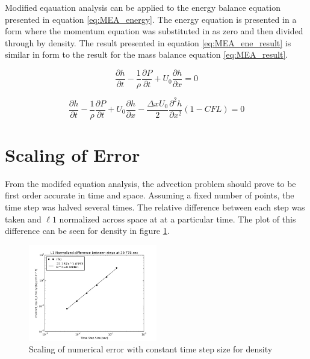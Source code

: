     Modified eqauation analysis can be applied to the energy balance equation
    presented in equation \ref{eq:MEA_energy}. The energy equation is presented in a form where
    the momentum equation was substituted in as zero and then divided through by
    density. The result presented in equation \ref{eq:MEA_ene_result} is similar in
    form to the result for the mass balance equation \ref{eq:MEA_result}.
    
    \begin{equation}
    	\label{eq:MEA_energy}
    	\frac{\partial h}{\partial t} - \frac{1}{\rho} \frac{\partial P}{\partial t} +
    	U_{0} \frac{\partial h}{\partial x} = 0
    \end{equation}
    
    \begin{equation}
    \label{eq:MEA_ene_result}
    	\frac{\partial h}{\partial t} - \frac{1}{\rho} \frac{\partial P}{\partial t} +
    	U_{0} \frac{\partial h}{\partial x} - 
    	\frac{\Delta x U_{0}}{2} \frac{\partial^2 h}{\partial x^2}
    	\left( 1 - CFL \right)
    	= 0
    \end{equation}
    
    \section{Scaling of Error}

	From the modifed equation analysis, the advection problem should prove to
	be first order accurate in time and space. Assuming a fixed number of points,
	the time step was halved several times. The relative difference between each
	step was taken and $\ell 1$ normalized across space at at a particular time.
	The plot of this difference can be seen for density in figure
	\ref{fig:Difference_rho}. 
    
    
    
    \begin{figure}[!h]
    	\centering
    	\includegraphics[width=0.50\textwidth]{images/Isokinetic_Advection/Difference_rho}
    	\caption{Scaling of numerical error with constant time step size for
    	density}
    	\label{fig:Difference_rho}
    \end{figure}
    
